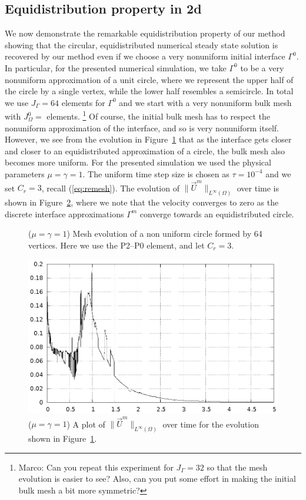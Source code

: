 \documentclass[a4paper,12pt,onecolumn]{article}
\begin{document}
\subsection{Equidistribution property in 2d}

We now demonstrate the remarkable equidistribution property of our method showing that the circular, equidistributed numerical steady state solution is recovered by our method even if we choose a very nonuniform initial interface $\Gamma^0$. 
In particular, for the presented numerical simulation, we take $\Gamma^0$ to 
be a very nonuniform approximation of a unit circle, where we represent the 
upper half of the circle by a single vertex, while the lower half resembles 
a semicircle. 
In total we use $J_\Gamma = 64$ elements for $\Gamma^0$ and we start with
a very nonuniform bulk mesh with $J_\Omega^0 = $ elements.
\footnote{Marco: Can you repeat this experiment for $J_\Gamma = 32$ so that the
mesh evolution is easier to see? Also, can you put some effort in making the
initial bulk mesh a bit more symmetric?}
Of course, the initial bulk mesh has to respect the nonuniform approximation 
of the interface, and so is very nonuniform itself.
However, we see from the evolution in Figure~\ref{fig:nonuniform_bubble_remesh}
that as the interface gets closer and closer to an equidistributed
approximation of a circle, the bulk mesh also becomes more uniform. For
the presented simulation we used the physical parameters
$\mu= \gamma=1$. The uniform time step size is chosen as $\tau=10^{-4}$ and 
we set $C_r=3$, recall (\ref{eq:remesh}). 
The evolution of $\|\vec U^m\|_{L^\infty(\Omega)}$ over time is shown in
Figure~\ref{fig:nonuniform_bubble_velocity_remesh}, where we note that the
velocity converges to zero as the discrete interface approximations 
$\Gamma^m$ converge towards an equidistributed circle.
\begin{figure}[htbp]
  \centering
  \caption{($\mu=\gamma=1$) Mesh evolution of a non uniform circle formed by 64 vertices. Here we use the P2--P0 element, and let $C_r = 3$.}
  \label{fig:nonuniform_bubble_remesh}
\end{figure}

\begin{figure}[htbp]
  \centering
  \includegraphics[width=.45\textwidth]{figures/nonuniform_bubble_velocity_remesh.ps}
\caption{($\mu=\gamma=1$) A plot of $\|\vec U^m\|_{L^\infty(\Omega)}$ over time
for the evolution shown in Figure~\ref{fig:nonuniform_bubble_remesh}.}
\label{fig:nonuniform_bubble_velocity_remesh}
\end{figure}
\end{document}
